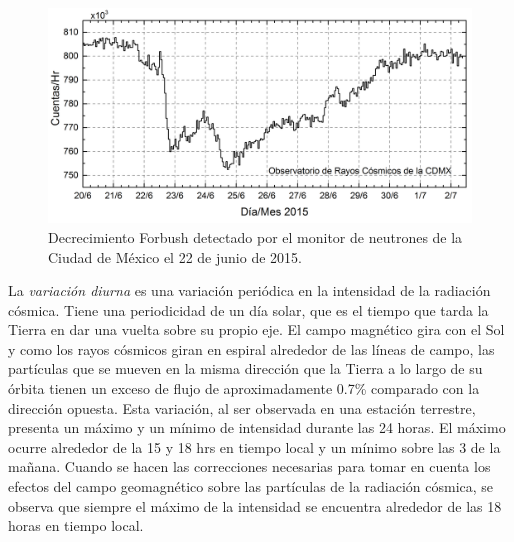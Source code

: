 \begin{figure}[H]
\centering
\includegraphics[scale=0.50]{Capitulo1/figs/Decrecimiento_Forbush.png}
\caption{Decrecimiento Forbush detectado por  el monitor de neutrones de la Ciudad de México el 22 de  junio de 2015.}
\label{forbush} 
\end{figure}

La \emph{variación diurna} es una variación periódica en la intensidad de la radiación cósmica. Tiene una  periodicidad de un día solar, que es el tiempo que tarda la Tierra en dar una vuelta sobre su propio eje. El campo magnético gira con el Sol y como los rayos cósmicos giran en espiral alrededor de las líneas de campo, las partículas que se mueven en la misma dirección que la Tierra a lo largo de su órbita tienen un exceso de flujo de aproximadamente 0.7\% comparado con la dirección opuesta\cite{grieder}. Esta variación, al ser observada en una estación terrestre, presenta un máximo y un mínimo de intensidad durante  las 24 horas. El máximo ocurre alrededor de la 15 y 18 hrs en tiempo local y un mínimo sobre las 3 de la mañana. Cuando se hacen las correcciones necesarias para tomar en cuenta los efectos del campo geomagnético sobre las partículas de la radiación cósmica, se observa que siempre el máximo de la intensidad se encuentra alrededor de las 18 horas en tiempo local\cite{mensajeros}. 